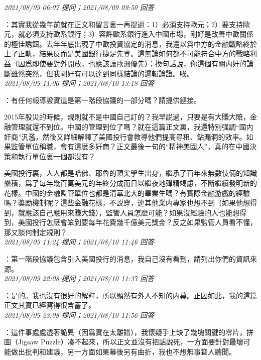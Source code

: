 \documentclass[twocolumn]{ctexart}
\begin{document}
\textit{\hfill\noindent\small 2021/08/09 06:07 提问；2021/08/09 09:50 回答}

：其實我從幾年前就在正文和留言裏一再提過：1）必須支持歐元；2）要支持歐元，就必須支持歐系銀行；3）容許歐系銀行進入中國市場，剛好是改善中歐關係的極佳誘餌。去年年底出現了中歐投資協定的消息，我還以爲中方的金融戰略終於上了正軌，結果反而是美國銀行捷足先登。這無論如何都不可能符合中方的戰略利益（因爲即使要對外開放，也應該讓歐洲優先）；換句話說，你這個有關内奸的論斷雖然突然，但我剛好有可以達到同樣結論的邏輯論證。唉。
\\

\textit{\hfill\noindent\small 2021/08/09 11:06 提问；2021/08/10 13:18 回答}

：有任何報導證實這是第一階段協議的一部分嗎？請提供鏈接。

2015年股災的時候，規則就不是中國自己訂的？我早説過，只要是有大賺大賠，金融管理就還不到位。中國的管理到位了嗎？就在這篇正文裏，我還特別强調“國内奸商”汎濫，然後又詳細解釋了美國投行會教導他們提高尋租、鉆漏洞的效率。如果監管單位稱職，會有這麽多奸商？正文最後一句的“精神美國人”，真的在中國決策和執行單位裏一個都沒有？

美國投行裏，人人都是哈佛、耶魯的頂尖學生出身，繼承了百年來無數伎倆的知識纍積，爲了每年幾百萬美元的年終分成而日以繼夜地殫精竭慮，不斷繼續發明新的花樣。中國的金融監管單位也都是清華北大的畢業生嗎？有實際金融游戲的經驗嗎？獎勵機制呢？這些金融花樣，不説穿，連其他業内專家也想不到（如果他想得到，就應該自己應用來賺大錢），監管人員怎麽可能？如果沒經驗的人也能想得到，美國投行怎麽會笨到要每年花費幾千億美元獎金？反之如果監管人員看不懂，那又談何制定規則？
\\

\textit{\hfill\noindent\small 2021/08/09 11:24 提问；2021/08/10 11:46 回答}

：第一階段協議包含引入美國投行的消息，我自己沒有看到，請列出你們的資訊來源。
\\

\textit{\hfill\noindent\small 2021/08/09 22:08 提问；2021/08/10 11:37 回答}

：是的。我也沒有很好的解釋，所以顯然有外人不知的内幕。正因如此，我的這篇正文其實已經寫得很含蓄了。
\\

\textit{\hfill\noindent\small 2021/08/09 23:08 提问；2021/08/10 11:56 回答}

：這件事處處透著詭異（因爲實在太離譜），我懷疑手上缺了幾塊關鍵的零片，拼圖（Jigsaw Puzzle）凑不起來，所以正文並沒有把話説死，一方面要針對最壞可能做出批判和建議，另一方面如果幕後另有曲折，我也不想無事聳人聽聞。
\\
\end{document}
